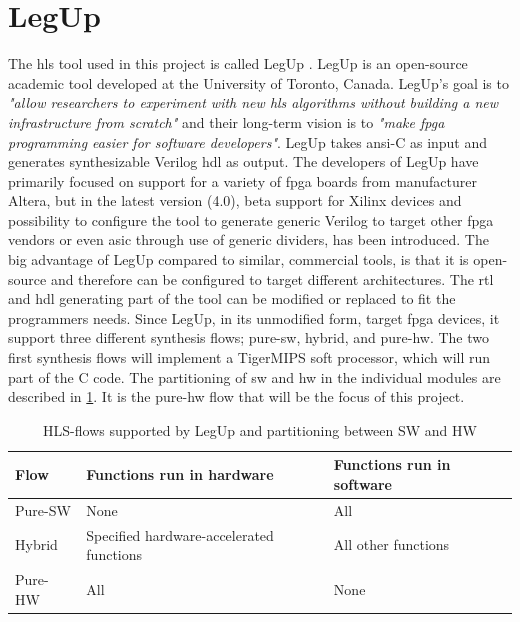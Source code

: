 \section{LegUp}
The \gls{hls} tool used in this project is called LegUp \cite{canis2011legup}. LegUp is an open-source academic tool developed at the University of Toronto, Canada. LegUp's goal is to \textit{"allow researchers to experiment with new \gls{hls} algorithms without building a new infrastructure from scratch"} and their long-term vision is to \textit{"make \gls{fpga} programming easier for software developers"}. LegUp takes \gls{ansi}-C as input and generates synthesizable Verilog \gls{hdl} as output. The developers of LegUp have primarily focused on support for a variety of \gls{fpga} boards from manufacturer Altera, but in the latest version (4.0), beta support for Xilinx devices and possibility to configure the tool to generate generic Verilog to target other \gls{fpga} vendors or even \gls{asic} through use of generic dividers, has been introduced. The big advantage of LegUp compared to similar, commercial tools, is that it is open-source and therefore can be configured to target different architectures. The \gls{rtl} and \gls{hdl} generating part of the tool can be modified or replaced to fit the programmers needs.
Since LegUp, in its unmodified form, target \gls{fpga} devices, it support three different synthesis flows; pure-\gls{sw}, hybrid, and pure-\gls{hw}. The two first synthesis flows will implement a TigerMIPS \cite{tigmips} soft processor, which will run part of the C code. The partitioning of \gls{sw} and \gls{hw} in the individual modules are described in \cref{tab:legupflows}. It is the pure-\gls{hw} flow that will be the focus of this project.

\begin{table}[hbpt]
    \centering
    \caption{\label{tab:legupflows}HLS-flows supported by LegUp and partitioning between SW and HW}
    \begin{tabular}{lp{4.8cm}p{4.8cm}}
      \textbf{Flow} & \textbf{Functions run in hardware} & \textbf{Functions run in software}\\
      \toprule
      Pure-SW & None & All \\
      \hline
      Hybrid & Specified hardware-accelerated functions & All other functions \\
      \hline
      Pure-HW & All & None\\
      \bottomrule
    \end{tabular}
\end{table}

